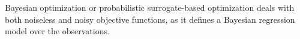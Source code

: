 
Bayesian optimization or probabilistic surrogate-based optimization deals with both noiseless and noisy objective functions,
as it defines a Bayesian regression model over the observations.


